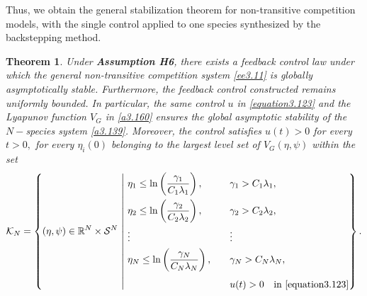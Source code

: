 \documentclass[10pt, a4paper]{amsart}
\theoremstyle{plain}
\newtheorem{theorem}[lemma]{Theorem}
\theoremstyle{definition}
\theoremstyle{remark}
\numberwithin{equation}{section}
\begin{document}
Thus, we obtain the general stabilization theorem for non-transitive  competition models, with the single control applied to one species synthesized by the backstepping method.
\begin{theorem}\label{theorem3.23}
Under {\bf Assumption H6}, there exists a feedback control law under which the general non-transitive competition system \eqref{ee3.11} is globally asymptotically stable. Furthermore, the feedback control constructed remains uniformly bounded.  In particular, the same control $u$  in \eqref{equation3.123} and the Lyapunov function $V_{G}$ in \eqref{a3.160} ensures the global asymptotic stability of the $N-$species system \eqref{a3.139}. Moreover, the control satisfies $u(t)>0$ for every $t>0,$ for every $\eta_i(0)$ belonging to the largest
level set of $V_G(\eta,\psi)$ within the set
\begin{equation}
\mathcal{K}_{N}=
\left\{ (\eta,\psi)\in \mathbb{R}^{N}\times\mathcal{S}^{N}\ \middle|\ 
\begin{alignedat}{2}
&\eta_1 \le \ln\left(\frac{\gamma_1}{C_1\lambda_1}\right), \qquad && \gamma_1 > C_1\lambda_1,\\
&\eta_2 \le \ln\left(\frac{\gamma_2}{C_2\lambda_2}\right), \qquad && \gamma_2 > C_2\lambda_2,\\
&\vdots && \vdots\\
&\eta_{N} \le \ln\left(\frac{\gamma_{N}}{C_{N}\lambda_{N}}\right), \qquad && \gamma_{N} > C_{N}\lambda_{N},\\[4pt]
&&& u(t)>0\quad\text{in }\eqref{equation3.123}
\end{alignedat}
\right\}.
\end{equation}
\end{theorem}
\end{document}
